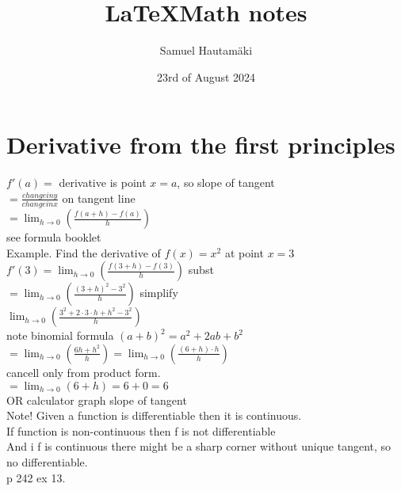 \documentclass{article}
\title{\LaTeX Math notes}
\author{Samuel Hautamäki}
\date{23rd of August 2024}
\begin{document}
  \maketitle
   
  \section{Derivative from the first principles}
  $f'(a) =$ derivative is point $x=a$, so slope of tangent\\
  $=\frac{change in y}{change in x}$ on tangent line\\
  $=\lim_{h\to 0}(\frac{f(a+h)-f(a)}{h})$\\
  see formula booklet\\
  Example. Find the derivative of $f(x)=x^2$ at point $x=3$\\
  $f'(3)=\lim_{h\to 0}(\frac{f(3+h)-f(3)}{h})$ subst\\
  $=\lim_{h\to0}(\frac{(3+h)^2-3^2}{h})$ simplify\\
  $\lim_{h\to0}(\frac{3^2+2\cdot3\cdot h+h^2-3^2}{h})$\\
  note binomial formula $(a+b)^2=a^2+2ab+b^2$\\
  $=\lim_{h\to0}(\frac{6h+h^2}{h})=\lim_{h\to0}(\frac{(6+h)\cdot h}{h})$\\
  cancell only from product form.\\
  $=\lim_{h\to0}(6+h)=6+0=6$\\
  OR calculator graph slope of tangent\\
  Note! Given a function is differentiable then it is continuous.\\
  If function is non-continuous then f is not differentiable\\
  And i f is continuous there might be a sharp corner without unique tangent, so no differentiable.\\
  p 242 ex 13.\\
\end{document}
